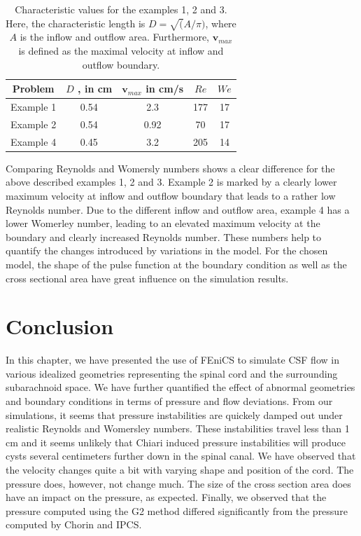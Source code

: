 \begin{table}
\begin{center}
\begin{tabular}{ | c | c | c | c | c |}
\hline
Problem & $D$ ,  in cm & $\mathbf{v}_{max}$ in cm/s  & $Re$ & $We$ \\ \hline\hline
	Example 1 	&	0.54 & 2.3 & 177 & 17	\\ \hline
	Example 2	&	0.54 & 0.92 & 70 & 17	\\ \hline
	Example 4	&	0.45 & 3.2 	& 205 & 14	\\ \hline
    \end{tabular}
	\label{tab:Re_We}
	\caption{Characteristic values for the examples 1, 2 and 3. Here, the  
	characteristic length is $D=\sqrt(A/\pi)$, where  $A$ is the inflow and outflow area. 
        Furthermore, $\mathbf{v}_{max}$ is defined as the maximal velocity at inflow and outflow boundary.
	}
\end{center}\end{table}

Comparing Reynolds and Womersly numbers shows a clear difference for
the above described examples 1, 2 and 3. Example 2 is marked by a
clearly lower maximum velocity at inflow and outflow boundary that
leads to a rather low Reynolds number. Due to the different inflow and
outflow area, example 4 has a lower Womerley number, leading to an
elevated maximum velocity at the boundary and clearly increased
Reynolds number. These numbers help to quantify the changes
introduced by variations in the model. For the chosen model, the shape
of the pulse function at the boundary condition as well as the cross
sectional area have great influence on the simulation results. 


\section{Conclusion}
In this chapter, we have presented the use of FEniCS to simulate CSF flow in 
various idealized geometries representing the
spinal cord and the surrounding subarachnoid space. We have further 
quantified the effect of abnormal geometries and boundary conditions 
in terms of pressure and flow deviations. From our simulations, it seems
that pressure instabilities are quickely damped out under realistic Reynolds and 
Womersley numbers. These instabilities travel less than 1 cm and it seems unlikely 
that Chiari induced pressure instabilities will produce cysts several centimeters further
down in the spinal canal. 
We have observed that the velocity changes quite a bit with varying shape and position of the 
cord. The pressure does, however, not change much. The size of the cross section area does have an impact
on the pressure, as expected. 
Finally, we observed that the pressure computed using the G2 method
differed significantly from the pressure computed by Chorin and IPCS. 

